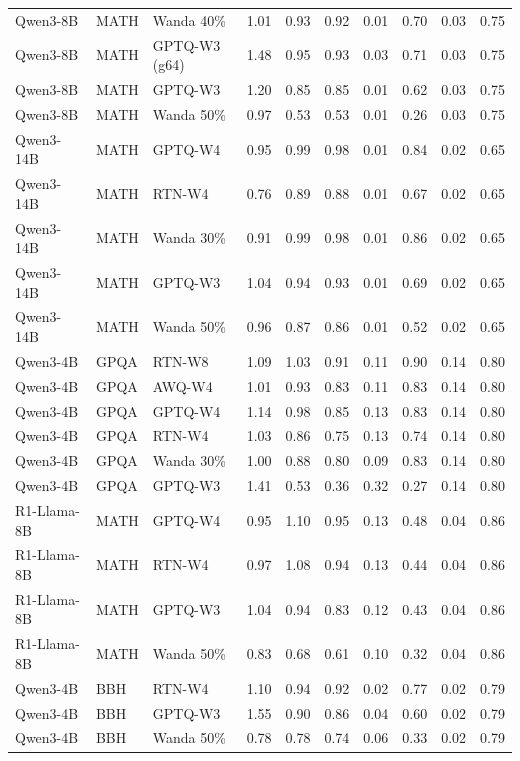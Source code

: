 \begin{tabular}{lllrrrrrrr}
Qwen3-8B & MATH & Wanda 40\% & 1.01 & 0.93 & 0.92 & 0.01 & 0.70 & 0.03 & 0.75 \\
Qwen3-8B & MATH & GPTQ-W3 (g64) & 1.48 & 0.95 & 0.93 & 0.03 & 0.71 & 0.03 & 0.75 \\
Qwen3-8B & MATH & GPTQ-W3 & 1.20 & 0.85 & 0.85 & 0.01 & 0.62 & 0.03 & 0.75 \\
Qwen3-8B & MATH & Wanda 50\% & 0.97 & 0.53 & 0.53 & 0.01 & 0.26 & 0.03 & 0.75 \\
Qwen3-14B & MATH & GPTQ-W4 & 0.95 & 0.99 & 0.98 & 0.01 & 0.84 & 0.02 & 0.65 \\
Qwen3-14B & MATH & RTN-W4 & 0.76 & 0.89 & 0.88 & 0.01 & 0.67 & 0.02 & 0.65 \\
Qwen3-14B & MATH & Wanda 30\% & 0.91 & 0.99 & 0.98 & 0.01 & 0.86 & 0.02 & 0.65 \\
Qwen3-14B & MATH & GPTQ-W3 & 1.04 & 0.94 & 0.93 & 0.01 & 0.69 & 0.02 & 0.65 \\
Qwen3-14B & MATH & Wanda 50\% & 0.96 & 0.87 & 0.86 & 0.01 & 0.52 & 0.02 & 0.65 \\
Qwen3-4B & GPQA & RTN-W8 & 1.09 & 1.03 & 0.91 & 0.11 & 0.90 & 0.14 & 0.80 \\
Qwen3-4B & GPQA & AWQ-W4 & 1.01 & 0.93 & 0.83 & 0.11 & 0.83 & 0.14 & 0.80 \\
Qwen3-4B & GPQA & GPTQ-W4 & 1.14 & 0.98 & 0.85 & 0.13 & 0.83 & 0.14 & 0.80 \\
Qwen3-4B & GPQA & RTN-W4 & 1.03 & 0.86 & 0.75 & 0.13 & 0.74 & 0.14 & 0.80 \\
Qwen3-4B & GPQA & Wanda 30\% & 1.00 & 0.88 & 0.80 & 0.09 & 0.83 & 0.14 & 0.80 \\
Qwen3-4B & GPQA & GPTQ-W3 & 1.41 & 0.53 & 0.36 & 0.32 & 0.27 & 0.14 & 0.80 \\
R1-Llama-8B & MATH & GPTQ-W4 & 0.95 & 1.10 & 0.95 & 0.13 & 0.48 & 0.04 & 0.86 \\
R1-Llama-8B & MATH & RTN-W4 & 0.97 & 1.08 & 0.94 & 0.13 & 0.44 & 0.04 & 0.86 \\
R1-Llama-8B & MATH & GPTQ-W3 & 1.04 & 0.94 & 0.83 & 0.12 & 0.43 & 0.04 & 0.86 \\
R1-Llama-8B & MATH & Wanda 50\% & 0.83 & 0.68 & 0.61 & 0.10 & 0.32 & 0.04 & 0.86 \\
Qwen3-4B & BBH & RTN-W4 & 1.10 & 0.94 & 0.92 & 0.02 & 0.77 & 0.02 & 0.79 \\
Qwen3-4B & BBH & GPTQ-W3 & 1.55 & 0.90 & 0.86 & 0.04 & 0.60 & 0.02 & 0.79 \\
Qwen3-4B & BBH & Wanda 50\% & 0.78 & 0.78 & 0.74 & 0.06 & 0.33 & 0.02 & 0.79 \\
\bottomrule
\end{tabular}
